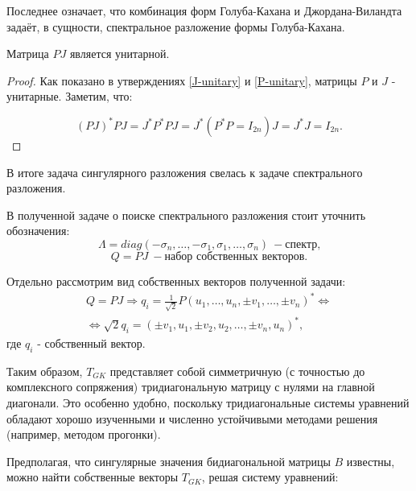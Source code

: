 Последнее означает, что комбинация форм Голуба-Кахана и Джордана-Виландта задаёт, в сущности, спектральное разложение формы Голуба-Кахана.


\begin{claim}
     Матрица \(PJ\) является унитарной.
\end{claim}
\begin{proof}
   Как показано в утверждениях  \ref{J-unitary} и \ref{P-unitary},  матрицы \(P\) и \(J\) - унитарные. Заметим, что:

    \[(PJ)^*PJ=J^* P^* P J=J^* (P^* P=I_{2n}) J=J^*J=I_{2n}.\]
    
\end{proof}


В итоге задача сингулярного разложения свелась к задаче спектрального разложения. 

\begin{note}
    В полученной задаче о поиске спектрального разложения стоит уточнить обозначения:
    \[
        \Lambda = diag(-\sigma_n,\dots,-\sigma_1,\sigma_1,\dots,\sigma_n) \ - \text{спектр,} 
    \]
    \[
        Q=PJ \ - \text{набор собственных векторов.}
    \]
\end{note}

Отдельно рассмотрим вид собственных векторов полученной задачи:
\begin{equation} \label{eq:eigenvector}
    \begin{split}
        Q=PJ \Rightarrow q_{i}=\frac{1}{\sqrt{2}}P(u_1,\dots,u_n,\pm v_1,\dots,\pm v_n)^* \Leftrightarrow \\[6pt]  \Leftrightarrow \sqrt{2}q_i=(\pm v_1,u_1,\pm v_2,u_2,\dots,\pm v_n,u_n)^*, 
    \end{split}
\end{equation}
где \(q_i\) - собственный вектор.


Таким образом, \( T_{GK} \) представляет собой симметричную (с точностью до комплексного сопряжения) тридиагональную матрицу с нулями на главной диагонали. Это особенно удобно, поскольку тридиагональные системы уравнений обладают хорошо изученными и численно устойчивыми методами решения (например, методом прогонки).


Предполагая, что сингулярные значения бидиагональной матрицы \( B \) известны, можно найти собственные векторы \( T_{GK} \), решая систему уравнений:

